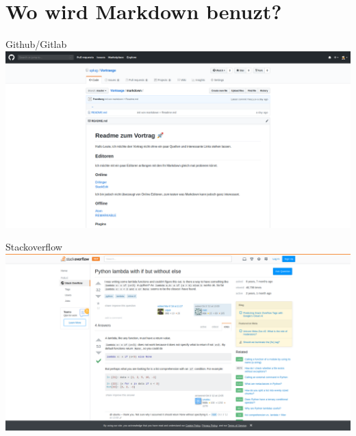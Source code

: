 \documentclass{beamer}
\begin{document}
\section{Wo wird Markdown benuzt?}

\begin{frame}{Github/Gitlab}
        \includegraphics[scale=0.18]{github.png}
\end{frame}

\begin{frame}{Stackoverflow}
        \includegraphics[scale=0.18]{stackoverflow.png}
\end{frame}
\end{document}
